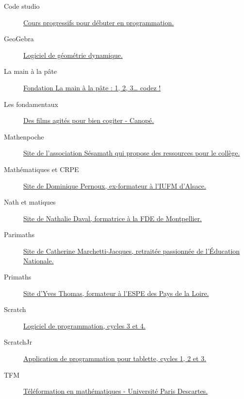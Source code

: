 {\begin{description}
   \item[Code studio] \href{https://studio.code.org}{Cours progressifs pour débuter en programmation.}
 
   \item[GeoGebra] \href{https://www.geogebra.org}{Logiciel de géométrie dynamique.}
   
   \item[La main à la pâte] \href{https://www.fondation-lamap.org/fr/123codez}{Fondation La main à la pâte : 1, 2, 3\dots{} codez !}
   
   \item[Les fondamentaux] \href{https://www.reseau-canope.fr/lesfondamentaux/discipline/mathematiques.html}{Des films agités pour bien cogiter - Canopé.}
   
   \item[Mathenpoche] \href{http://mathenpoche.sesamath.net}{Site de l'association Sésamath qui propose des ressources pour le collège.}
   
   \item[Mathématiques et CRPE] \href{http://dpernoux.free.fr/CRPE.htm}{Site de Dominique Pernoux, ex-formateur à l'IUFM d'Alsace.}
   
   \item[Nath et matiques] \href{http://mathematiques.daval.free.fr}{Site de Nathalie Daval, formatrice à la FDE de Montpellier.}
   
   \item[Parimaths] \href{http://www.parimaths.com}{Site de Catherine Marchetti-Jacques, retraitée passionnée de l'Éducation Nationale.}
   
   \item[Primaths] \href{http://primaths.fr}{Site d'Yves Thomas, formateur à l'ESPE des Pays de la Loire.}
   
   \item[Scratch] \href{https://scratch.mit.edu}{Logiciel de programmation, cycles 3 et 4.}  
   \item[ScratchJr] \href{http://www.scratchjr.org}{Application de programmation pour tablette, cycles 1, 2 et 3.}
   
   \item[TFM] \href{http://www.uvp5.univ-paris5.fr/TFM/}{Téléformation en mathématiques - Université Paris Descartes.}
\end{description}


\par}

\label{sol}